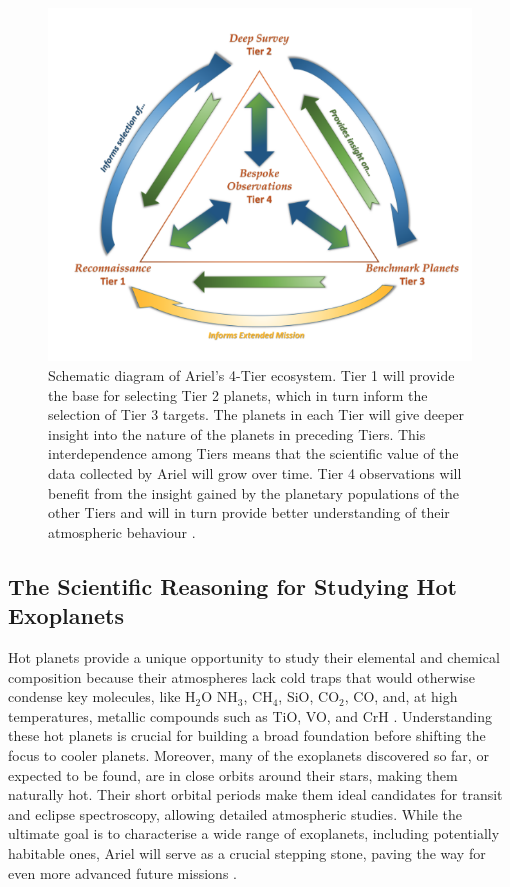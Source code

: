 \documentclass[12pt]{article}
\begin{document}
\begin{figure}
    \centering
    \includegraphics[width=.55\textwidth]{tiers ariel.png}
    \caption{Schematic diagram of Ariel's 4-Tier ecosystem. Tier 1 will provide the base for selecting Tier 2 planets, which in turn inform the selection of Tier 3 targets. The planets in each Tier will give deeper insight into the nature of the planets in preceding Tiers. This interdependence among Tiers means that the
    scientific value of the data collected by Ariel will grow over time. Tier 4 observations will benefit from the insight gained by the planetary populations of the other Tiers and will in turn provide better understanding of their atmospheric behaviour \protect\cite[p.40]{arielstudyreport}.}
    \label{fig:5}
\end{figure}

\subsection{The Scientific Reasoning for Studying Hot Exoplanets} \label{sec:3.4}

Hot planets provide a unique opportunity to study their elemental and chemical composition because their atmospheres lack cold traps that would otherwise condense key molecules, like H$_2$O NH$_3$, CH$_4$, SiO, CO$_2$, CO, and, at high temperatures, metallic compounds such as TiO, VO, and CrH \cite{ARIEL_M4_Proposal} \cite[p.135]{tinetti2018chemical}.
Understanding these hot planets is crucial for building a broad foundation before shifting the focus to cooler planets. Moreover, many of the exoplanets discovered so far, or expected to be found, are in close orbits around their stars, making them naturally hot. Their short orbital periods make them ideal candidates for transit and eclipse spectroscopy, allowing detailed
atmospheric studies. While the ultimate goal is to characterise a wide range of exoplanets, including potentially habitable ones, Ariel will serve as a crucial stepping stone, paving the way for even more advanced future missions \cite{ARIEL_M4_Proposal}.
\end{document}
